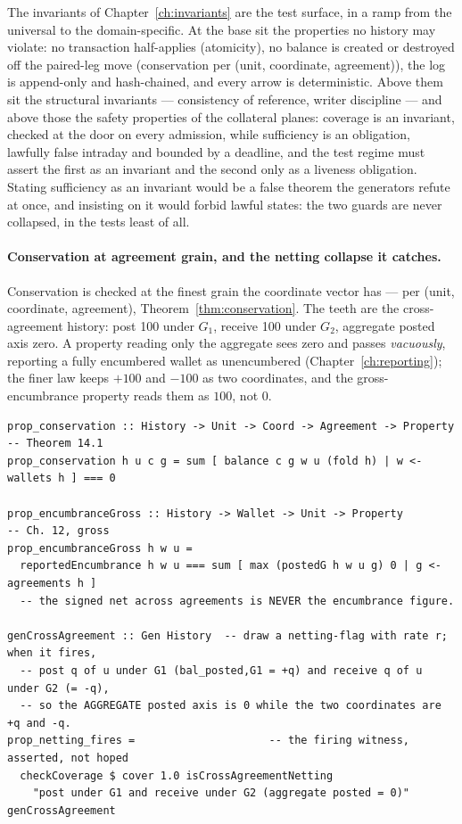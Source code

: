 \documentclass[11pt,a4paper]{article}
\begin{document}
The invariants of Chapter~\ref{ch:invariants} are the test surface, in a ramp from the
universal to the domain-specific. At the base sit the properties no history may violate: no
transaction half-applies (atomicity), no balance is created or destroyed off the paired-leg
move (conservation per (unit, coordinate, agreement)), the log is append-only and
hash-chained, and every arrow is deterministic. Above them sit the structural invariants --- consistency of
reference, writer discipline --- and above those the safety properties of the collateral
planes: coverage is an invariant, checked at the door on every admission, while sufficiency
is an obligation, lawfully false intraday and bounded by a deadline, and the test regime
must assert the first as an invariant and the second only as a liveness obligation. Stating
sufficiency as an invariant would be a false theorem the generators refute at once, and
insisting on it would forbid lawful states: the two guards are never collapsed, in the tests
least of all.

\paragraph{Conservation at agreement grain, and the netting collapse it catches.}
Conservation is checked at the finest grain the coordinate vector has --- per (unit,
coordinate, agreement), Theorem~\ref{thm:conservation}. The teeth are the cross-agreement
history: post 100 under $G_1$, receive 100 under $G_2$, aggregate posted axis zero. A
property reading only the aggregate sees zero and passes \emph{vacuously}, reporting a
fully encumbered wallet as unencumbered (Chapter~\ref{ch:reporting}); the finer law keeps
$+100$ and $-100$ as two coordinates, and the gross-encumbrance property reads them as
$100$, not $0$.

\begin{lstlisting}
prop_conservation :: History -> Unit -> Coord -> Agreement -> Property  -- Theorem 14.1
prop_conservation h u c g = sum [ balance c g w u (fold h) | w <- wallets h ] === 0

prop_encumbranceGross :: History -> Wallet -> Unit -> Property          -- Ch. 12, gross
prop_encumbranceGross h w u =
  reportedEncumbrance h w u === sum [ max (postedG h w u g) 0 | g <- agreements h ]
  -- the signed net across agreements is NEVER the encumbrance figure.

genCrossAgreement :: Gen History  -- draw a netting-flag with rate r; when it fires,
  -- post q of u under G1 (bal_posted,G1 = +q) and receive q of u under G2 (= -q),
  -- so the AGGREGATE posted axis is 0 while the two coordinates are +q and -q.
prop_netting_fires =                     -- the firing witness, asserted, not hoped
  checkCoverage $ cover 1.0 isCrossAgreementNetting
    "post under G1 and receive under G2 (aggregate posted = 0)" genCrossAgreement
\end{lstlisting}
\end{document}
